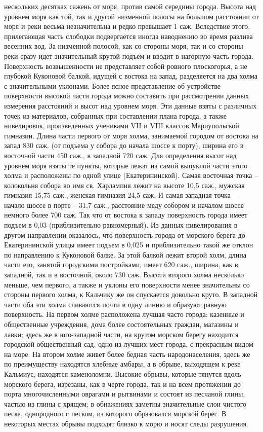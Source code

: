 нескольких десятках сажень от моря, против самой середины города. Высота над
уровнем моря как той, так и другой низменной полосы на большом расстоянии от
моря и реки весьма незначительна и редко превышает 1 саж. Вследствие этого,
прилегающая часть слободки подвергается иногда наводнению во время разлива
весенних вод. За низменной полосой, как со стороны моря, так и со стороны реки
сразу идет значительный крутой подъем и вводит в нагорную часть города.
Поверхность возвышенности не представляет собой ровного плоскогорья, а не
глубокой Куконовой балкой, идущей с востока на запад, разделяется на два холма
с значительными уклонами. Более ясное представление об устройстве поверхности
высокой части города можно составить при рассмотрении данных измерения
расстояний и высот над уровнем моря. Эти данные взяты с различных точек из
материалов, собранных при составлении плана города, а также нивелировок,
произведенных учениками VII и VIII классов Мариупольской гимназии. Длина части
первого от моря холма, занимаемой городом от востока на запад 830 саж. (от
подъема у собора до начала шоссе к порту), ширина его в восточной части 450
саж., в западной 720 саж. Для определения высот над уровнем моря взяты те
пункты, которые лежат на самой выпуклой части этого холма и расположены по
одной улице (Екатерининской). Самая восточная точка – колокольня собора во имя
св. Харлампия лежит на высоте 10,5 саж., мужская гимназия 15,75 саж., женская
гимназия 24,5 саж. И самая западная точка – начало шоссе в порте – 31,7 саж.,
расстояние меду собором и началом шоссе немного более 700 саж. Так что от
востока к западу поверхность города имеет подъем в 0,03 (приблизительно
равномерный). Из данных нивелирования в другом направлении оказалось, что
поверхность города от морского берега до Екатерининской улицы имеет подъем в
0,025 и приблизительно такой же отклон по направлению к Куконовой балке. За
этой балкой лежит второй холм, длина части его, занятой городскими постройками,
имеет 620 саж., ширина, как в западной, так и в восточной, около 730 саж.
Высота второго холма несколько меньше, чем первого, а также и уклоны его
поверхности менее значительны со стороны первого холма, к Кальчику же он
спускается довольно круто. В западной части оба эти холма сливаются почти в
одну линию и образуют равную поверхность. На первом холме расположена лучшая
часто города: казенные и общественные учреждения, дома более состоятельных
граждан, магазины и лавки; здесь же в юго-западной части, на крутом морском
берегу находится городской общественный сад, одно из лучших мест города, с
прекрасным видом на море. На втором холме живет более бедная часть
народонаселения, здесь же по преимуществу находятся хлебные  амбары, а в
обрыве, выходящем к реке Кальмиус, находятся каменоломни. Высокие обрывы,
которые тянутся вдоль морского берега, изрезаны, как в черте города, так и на
всем протяжении до порта многочисленными оврагами и рытвинами и состоят из
песчаной глины, частью из глины с хрящем; в обнажениях заметны значительные
слои чистого песка, однородного с песком, из которого образовался морской
берег. В некоторых местах обрывы подходят близко к морю и носят следы
разрушения.

